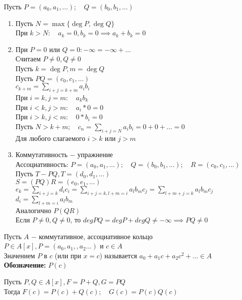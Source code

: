 \begin{replacementproof}
	Пусть $P=(a_0,a_1,\ldots); \quad Q=(b_0,b_1,\ldots)$
	\begin{enumerate}
		\item Пусть $N=\max\{\deg P, \deg Q\}$ \\
			При $k>N: \quad a_k=0, b_k=0 \implies a_k+b_k=0$
		\item При $P=0$ или $Q=0: -\infty = -\infty +\ldots$\\
			Считаем $P\neq 0, Q\neq 0$\\
			Пусть $k=\deg P, m=\deg Q$\\
			Пусть  $PQ=(c_0,c_1,\ldots)$ \\
			$c_{k+m}=\displaystyle\sum_{i+j=k+m}^{} a_ib_i$ \\
			При $i=k,j=m: \quad a_kb_k$\\
			При $i<k, j>m: \quad a_i*0=0$\\
			При  $i>k, j<m: \quad 0*b_i=0$\\
			Пусть $N>k+m; \quad c_n=\displaystyle\sum_{i+j=N}^{} a_ib_i=0+0+\ldots=0$ \\
			Для любого слагаемого $i>k$ или $j>m$
		\item Коммутативность $-$ упражнение\\
			Ассоциативность: $P=(a_0,a_1,\ldots); \quad Q=(b_0,b_1,\ldots); \quad R=(c_0,c_1,\ldots)$ \\
			Пусть $T-PQ, T=(d_0,d_1,\ldots)$ \\
			$S=(PQ)R=(e_0,e_1,\ldots)$ \\
			$e_k=\displaystyle\sum_{i+j=k}^{} d_ic_i = \displaystyle\sum_{i+j=k, l+m=i}^{} a_lb_mc_j = \displaystyle\sum_{l+m+j=k}^{} a_lb_mc_j$ \\
			$d_i=\displaystyle\sum_{l+m=i}^{} a_lb_m$ \\
			Аналогично $P(QR)$ \\
			Если $P \neq 0, Q \neq 0$, то $degPQ=degP+degQ \neq -\infty \implies PQ \neq 0$
	\end{enumerate}
\end{replacementproof}
\begin{definition}
	Пусть $A$ $-$ коммутативное, ассоциативное кольцо\\
	$P\in A[x], P=(a_0,a_1,,a_2\ldots)$ и $c\in A$\\
	Значением $P$ в $c$ (или при $x=c$) называется $a_0+a_1c+a_2c^2+\ldots \in A$\\
	\textbf{Обозначение:} $P(c)$
\end{definition}
\begin{properties}
	Пусть $P,Q \in A[x], F=P+Q, G=PQ$ \\
	Тогда $F(c)=P(c)+Q(c); \quad G(c)=P(c)Q(c)$
\end{properties}


